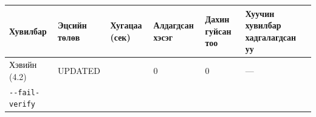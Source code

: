 \begingroup\scriptsize\begin{longtable}[]{@{}llllll@{}}
\toprule
\begin{minipage}[b]{0.14\columnwidth}\raggedright
Хувилбар\strut
\end{minipage} & \begin{minipage}[b]{0.14\columnwidth}\raggedright
Эцсийн төлөв\strut
\end{minipage} & \begin{minipage}[b]{0.14\columnwidth}\raggedright
Хугацаа (сек)\strut
\end{minipage} & \begin{minipage}[b]{0.14\columnwidth}\raggedright
Алдагдсан хэсэг\strut
\end{minipage} & \begin{minipage}[b]{0.14\columnwidth}\raggedright
Дахин гуйсан тоо\strut
\end{minipage} & \begin{minipage}[b]{0.14\columnwidth}\raggedright
Хуучин хувилбар хадгалагдсан уу\strut
\end{minipage}\tabularnewline
\midrule
\endhead
\begin{minipage}[t]{0.14\columnwidth}\raggedright
Хэвийн (4.2)\strut
\end{minipage} & \begin{minipage}[t]{0.14\columnwidth}\raggedright
UPDATED\strut
\end{minipage} & \begin{minipage}[t]{0.14\columnwidth}\raggedright
\strut
\end{minipage} & \begin{minipage}[t]{0.14\columnwidth}\raggedright
0\strut
\end{minipage} & \begin{minipage}[t]{0.14\columnwidth}\raggedright
0\strut
\end{minipage} & \begin{minipage}[t]{0.14\columnwidth}\raggedright
---\strut
\end{minipage}\tabularnewline
\begin{minipage}[t]{0.14\columnwidth}\raggedright
\texttt{-\/-fail-verify}\strut
\end{minipage} & \begin{minipage}[t]{0.14\columnwidth}\raggedright
\strut
\end{minipage} & \begin{minipage}[t]{0.14\columnwidth}\raggedright
\strut
\end{minipage} & \begin{minipage}[t]{0.14\columnwidth}\raggedright

\end{minipage}
\end{longtable}

